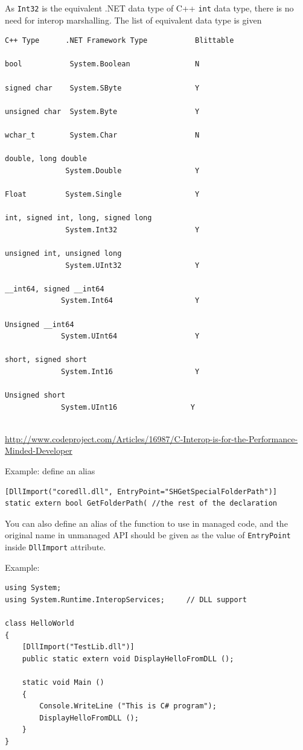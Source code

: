 As \verb!Int32! is the equivalent .NET data type of C++ \verb!int! data type, there is no need for interop marshalling. The list of equivalent data type is given
\begin{verbatim}
C++ Type      .NET Framework Type           Blittable

bool           System.Boolean               N

signed char    System.SByte                 Y

unsigned char  System.Byte                  Y

wchar_t        System.Char                  N

double, long double
              System.Double                 Y

Float         System.Single                 Y

int, signed int, long, signed long
              System.Int32                  Y

unsigned int, unsigned long
              System.UInt32                 Y

__int64, signed __int64
             System.Int64                   Y

Unsigned __int64
             System.UInt64                  Y

short, signed short
             System.Int16                   Y

Unsigned short
             System.UInt16                 Y


\end{verbatim}
\url{http://www.codeproject.com/Articles/16987/C-Interop-is-for-the-Performance-Minded-Developer}


Example: define an alias
\begin{verbatim}
[DllImport("coredll.dll", EntryPoint="SHGetSpecialFolderPath")]
static extern bool GetFolderPath( //the rest of the declaration
\end{verbatim}
You can also define an alias of the function to use in managed code, and the
original name in unmanaged API should be given as the value of \verb!EntryPoint!
inside \verb!DllImport! attribute.


Example:
\begin{verbatim}
using System;
using System.Runtime.InteropServices;     // DLL support

class HelloWorld
{
    [DllImport("TestLib.dll")]
    public static extern void DisplayHelloFromDLL ();

    static void Main ()
    {
        Console.WriteLine ("This is C# program");
        DisplayHelloFromDLL ();
    }
}
\end{verbatim}

